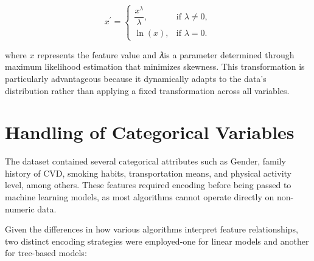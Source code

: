 
\begin{equation}
x^\prime =
\begin{cases}
\dfrac{x^\lambda}{\lambda}, & \text{if } \lambda \neq 0,\\[1mm]
\ln(x), & \text{if } \lambda = 0.
\end{cases}
\label{eq:eq_box_cox}
\end{equation}

where $x$ represents the feature value and 𝜆is a parameter determined through maximum likelihood estimation that minimizes skewness.
This transformation is particularly advantageous because it dynamically adapts to the data's distribution rather than applying a fixed transformation across all variables.



\section{Handling of Categorical Variables}\label{sec:handling-of-categorical-variables}

The dataset contained several categorical attributes such as Gender, family history of CVD, smoking habits, transportation means, and physical activity level, among others.
These features required encoding before being passed to machine learning models, as most algorithms cannot operate directly on non-numeric data.

Given the differences in how various algorithms interpret feature relationships, two distinct encoding strategies were employed-one for linear models and another for tree-based models:

